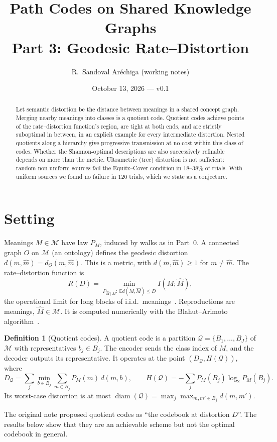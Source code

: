 \documentclass[11pt]{article}
\title{Path Codes on Shared Knowledge Graphs\\[2pt]\large Part 3: Geodesic Rate--Distortion}
\author{R.~Sandoval Ar\'echiga (working notes)}
\date{October 13, 2026 --- v0.1}
\theoremstyle{definition}
\newtheorem{definition}{Definition}
\theoremstyle{remark}
\newcommand{\M}{\mathcal{M}}
\newcommand{\Q}{\mathcal{Q}}
\newcommand{\E}{\mathbb{E}}
\DeclareMathOperator{\diam}{diam}
\begin{document}
\maketitle

\begin{abstract}
Let semantic distortion be the distance between meanings in a shared concept graph. Merging nearby meanings into classes is a quotient code. Quotient codes achieve points of the rate--distortion function's region, are tight at both ends, and are strictly suboptimal in between, in an explicit example for every intermediate distortion. Nested quotients along a hierarchy give progressive transmission at no cost within this class of codes. Whether the Shannon-optimal descriptions are also successively refinable depends on more than the metric. Ultrametric (tree) distortion is not sufficient: random non-uniform sources fail the Equitz--Cover condition in $18$--$38\%$ of trials. With uniform sources we found no failure in $120$ trials, which we state as a conjecture.
\end{abstract}

\section{Setting}

Meanings $M\in\M$ have law $P_M$, induced by walks as in Part~0. A connected graph $O$ on $\M$ (an ontology) defines the geodesic distortion $d(m,\hat m)=d_O(m,\hat m)$. This is a metric, with $d(m,\hat m)\ge1$ for $m\neq\hat m$. The rate--distortion function is
\[
R(D)=\min_{P_{\hat M\mid M}:\ \E d(M,\hat M)\le D} I(M;\hat M),
\]
the operational limit for long blocks of i.i.d.\ meanings~\cite{cover2006}. Reproductions are meanings, $\hat M\in\M$. It is computed numerically with the Blahut--Arimoto algorithm~\cite{blahut1972,arimoto1972}.

\begin{definition}[Quotient codes]
A quotient code is a partition $\Q=\{B_1,\dots,B_J\}$ of $\M$ with representatives $b_j\in B_j$. The encoder sends the class index of $M$, and the decoder outputs its representative. It operates at the point $(D_\Q,H(\Q))$, where
\[
D_\Q=\sum_j\min_{b\in B_j}\sum_{m\in B_j}P_M(m)\,d(m,b),\qquad H(\Q)=-\sum_jP_M(B_j)\log_2P_M(B_j).
\]
Its worst-case distortion is at most $\diam(\Q)=\max_j\max_{m,m'\in B_j}d(m,m')$.
\end{definition}

The original note proposed quotient codes as ``the codebook at distortion $D$''. The results below show that they are an achievable scheme but not the optimal codebook in general.
\end{document}
